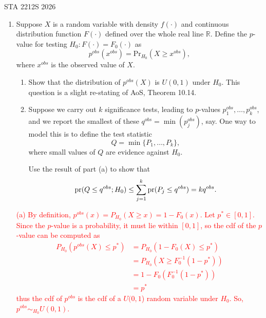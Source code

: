 \documentclass[12pt]{article}
\def\Pr{{\rm pr}}
\def\blue{\color{blue}}
\begin{document}
 {\hfill STA 2212S 2026}\\


\bigskip

\begin{enumerate}

\item Suppose $X$ is a random variable with density $f(\cdot)$ and continuous distribution function $F(\cdot)$ defined over the whole real line $\mathbb{R}$.  Define the $p$-value for testing $H_0:F(\cdot) = F_0(\cdot)$ as $$
p^{obs}(x^{obs}) = \text{Pr}_{H_0}(X \ge x^{obs}),$$ where $x^{obs}$ is the observed value of $X$. 
\begin{enumerate}
\item 	Show that the distribution of $p^{obs}(X)$ is $U(0,1)$ under $H_0$. This question is a slight re-stating of {\blue AoS, Theorem 10.14}.
\item Suppose we carry out $k$ significance tests, leading to $p$-values $p_1^{obs}, \dots, p_k^{obs}$, and we report the smallest of these $q^{obs} = \min(p_j^{obs})$, say. One way to model this is to define the test statistic  
$$
Q = \min\{P_1, \dots, P_k\}, 
$$
where small values of $Q$ are evidence against $H_0$. 

Use the result of part (a) to show that
$$
\Pr(Q \le  q^{obs}; H_0) \le \sum_{j=1}^k\Pr(P_j \le q^{obs}) = kq^{obs}.
$$   
\end{enumerate}
\textcolor{red}{
(a) By definition, $p^{obs}(x) = P_{H_0}(X \geq x) = 1 - F_0(x)$. Let $p^* \in [0, 1]$. Since the $p$-value is a probability, it must lie within $[0, 1]$, so the cdf of the $p$-value can be computed as
\begin{align*}
    P_{H_0}(p^{obs}(X) \leq p^*) &= P_{H_0}(1 - F_0(X) \leq p^*) \\
    &= P_{H_0}(X \geq F_0^{-1}(1 - p^*)) \\
    &= 1 - F_0(F_0^{-1}(1 - p^*))\\
    &= p^*
\end{align*}
thus the cdf of $p^{obs}$ is the cdf of a $U(0, 1$) random variable under $H_0$. So, $p^{obs} \sim_{H_0} U(0, 1)$.
}


\end{enumerate}
\end{document}
